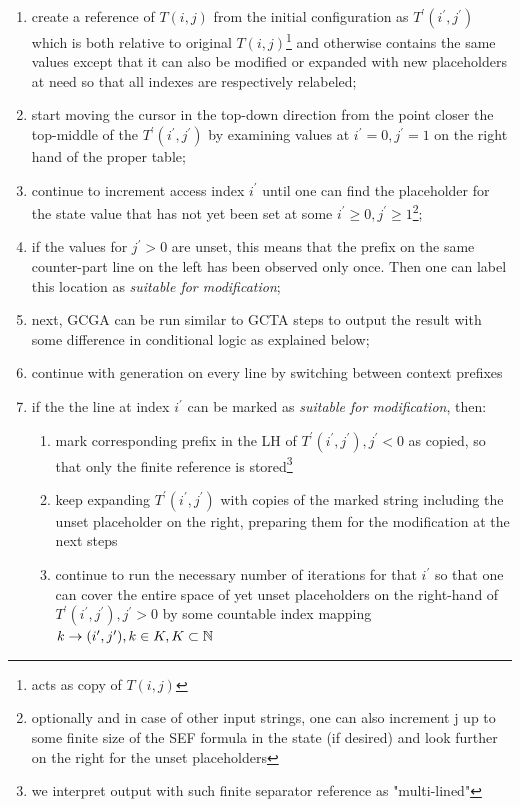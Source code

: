 \begin{enumerate}
  \item create a reference of $T(i,j)$ from the initial configuration as $T^\prime(i^\prime,j^\prime)$ which is both relative to original $T(i,j)$\footnote{acts as copy of $T(i,j)$} and otherwise contains the same values except that it can also be modified or expanded with new placeholders at need so that all indexes are respectively relabeled;
  \item start moving the cursor in the top-down direction from the point closer the top-middle of the $T^\prime(i^\prime,j^\prime)$ by examining values at $i^\prime = 0, j^\prime = 1$ on the right hand of the proper table;
  \item continue to increment access index $i^\prime$ until one can find the placeholder for the state value that has not yet been set at some $i^\prime \geq 0, j^\prime \geq 1$\footnote{optionally and in case of other input strings, one can also increment j up to some finite size of the SEF formula in the state (if desired) and look further on the right for the unset placeholders};
  \item if the values for $j^\prime > 0$ are unset, this means that the prefix on the same counter-part line on the left has been observed only once. Then one can label this location as \textit{suitable for modification};
  \item next, GCGA can be run similar to GCTA steps to output the result with some difference in conditional logic as explained below;
  \item continue with generation on every line by switching between context prefixes
  \item if the the line at index $i^\prime$ can be marked as \textit{suitable for modification}, then:
        \begin{enumerate}
          \item mark corresponding prefix in the LH of $T^\prime(i^\prime,j^\prime), j^\prime<0$ as copied, so that only the finite reference is stored\footnote{we interpret output with such finite separator reference as "multi-lined"}
          \item keep expanding $T^\prime(i^\prime,j^\prime)$ with copies of the marked string including the unset placeholder on the right, preparing them for the modification at the next steps
          \item continue to run the necessary number of iterations for that $i^\prime$ so that one can cover the entire space of yet unset placeholders on the right-hand of $T^\prime(i^\prime,j^\prime), j^\prime>0$ by some countable index mapping $k \rightarrow (i^\prime,j^\prime), k \in K, K \subset \mathbb{N}$

\end{enumerate}
\end{enumerate}

